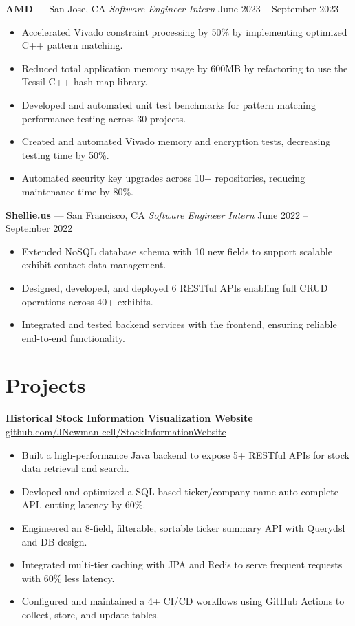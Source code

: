\documentclass[letterpaper,11pt]{article}
\begin{document}
\textbf{AMD} — San Jose, CA  
\textit{Software Engineer Intern} \hfill June 2023 -- September 2023
\begin{itemize}[leftmargin=*, itemsep=2pt, parsep=0pt, topsep=2pt]
\item Accelerated Vivado constraint processing by 50\% by implementing optimized C++ pattern matching.
\item Reduced total application memory usage by 600MB by refactoring to use the Tessil C++ hash map library.
\item Developed and automated unit test benchmarks for pattern matching performance testing across 30 projects.
\item Created and automated Vivado memory and encryption tests, decreasing testing time by 50\%.
\item Automated security key upgrades across 10+ repositories, reducing maintenance time by 80\%.
\end{itemize}

\textbf{Shellie.us} — San Francisco, CA  
\textit{Software Engineer Intern} \hfill June 2022 -- September 2022
\begin{itemize}[leftmargin=*, itemsep=2pt, parsep=0pt, topsep=2pt]
\item Extended NoSQL database schema with 10 new fields to support scalable exhibit contact data management.
\item Designed, developed, and deployed 6 RESTful APIs enabling full CRUD operations across 40+ exhibits.
\item Integrated and tested backend services with the frontend, ensuring reliable end-to-end functionality.
\end{itemize}

\section{Projects}

\textbf{Historical Stock Information Visualization Website}  
\href{https://github.com/JNewman-cell/StockInformationWebsiteBackend}{github.com/JNewman-cell/StockInformationWebsite}

\begin{itemize}[leftmargin=*, itemsep=2pt, parsep=0pt, topsep=2pt]
    \item Built a high-performance Java backend to expose 5+ RESTful APIs for stock data retrieval and search. 
    \item Devloped and optimized a SQL-based ticker/company name auto-complete API, cutting latency by 60\%.
    \item Engineered an 8-field, filterable, sortable ticker summary API with Querydsl and DB design.
    \item Integrated multi-tier caching with JPA and Redis to serve frequent requests with 60\% less latency.
    \item Configured and maintained a 4+ CI/CD workflows using GitHub Actions to collect, store, and update tables.
\end{itemize}
\end{document}
